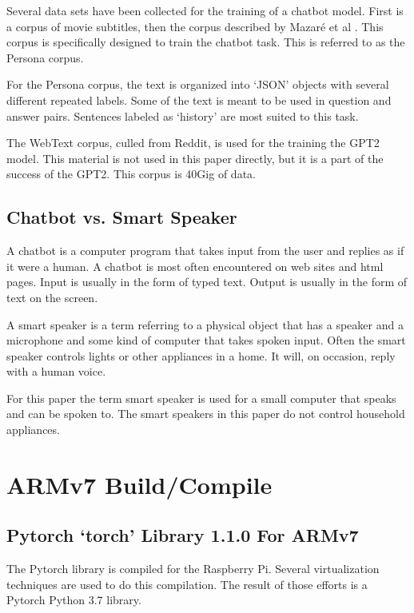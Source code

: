 Several data sets have been collected for the training of a chatbot model. First is a corpus of movie subtitles, then the corpus described by Mazar{\'{e}} et al \cite{DBLP:journals/corr/abs-1809-01984}. This corpus is specifically designed to train the chatbot task. This is referred to as the Persona corpus.

For the Persona corpus, the text is organized into `JSON' objects with several different repeated labels. Some of the text is meant to be used in question and answer pairs. Sentences labeled as `history' are most suited to this task. %

The WebText corpus, culled from Reddit, is used for the training the GPT2 model. This material is not used in this paper directly, but it is a part of the success of the GPT2. This corpus is 40Gig of data.

\subsection{Chatbot vs. Smart Speaker}

A chatbot is a computer program that takes input from the user and replies as if it were a human. A chatbot is most often encountered on web sites and html pages. Input is usually in the form of typed text. Output is usually in the form of text on the screen.

A smart speaker is a term referring to a physical object that has a speaker and a microphone and some kind of computer that takes spoken input. Often the smart speaker controls lights or other appliances in a home. It will, on occasion, reply with a human voice. 

For this paper the term smart speaker is used for a small computer that speaks and can be spoken to. The smart speakers in this paper do not control household appliances.

\section{ARMv7 Build/Compile}

\subsection{Pytorch `torch' Library 1.1.0 For ARMv7}
The Pytorch library is compiled for the Raspberry Pi. Several virtualization techniques are used to do this compilation. The result of those efforts is a Pytorch Python 3.7 library. %

